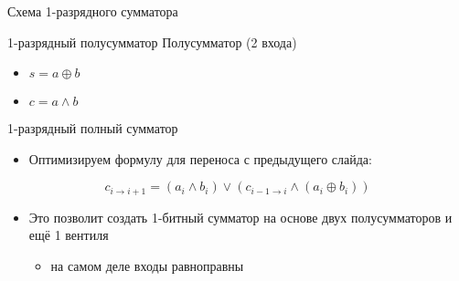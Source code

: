 \documentclass[xetex,aspectratio=43]{beamer}
\begin{document}
\begin{frame}{Схема 1-разрядного сумматора}
    \begin{block}{1-разрядный полусумматор}
        Полусумматор (2 входа)

        \begin{itemize}
            \tightlist
            \item
            \(s = a \oplus b\)
            \item
            \(c = a \wedge b\)
        \end{itemize}
    \end{block}

    \begin{block}{1-разрядный полный сумматор}
        \begin{itemize}
            \tightlist
            \item
            Оптимизируем формулу для переноса с предыдущего слайда:
        \end{itemize}

        \[c_{i \rightarrow i+1} = (a_i \land b_i) \lor (c_{i-1 \rightarrow i} \land (a_i \oplus b_i))\]

        \begin{itemize}
            \tightlist
            \item
            Это позволит создать 1-битный сумматор на основе двух полусумматоров и
            ещё 1 вентиля

            \begin{itemize}
                \tightlist
                \item
                на самом деле входы равноправны
            \end{itemize}
        \end{itemize}
    \end{block}
\end{frame}
\end{document}
